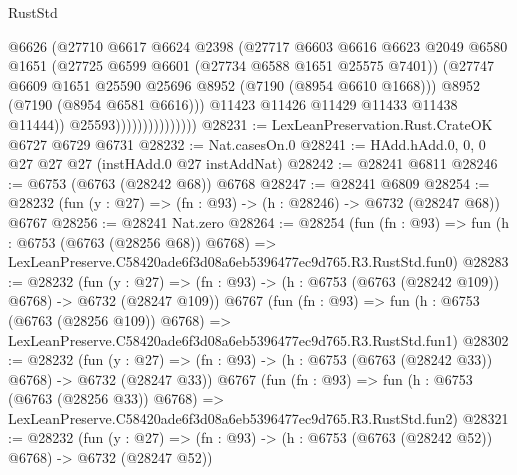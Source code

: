 \begin{lexlean}{RustStd}
\begin{coremodule}
                                    @6626
                                    (@27710
                                      @6617
                                      @6624
                                      @2398
                                      (@27717
                                        @6603
                                        @6616
                                        @6623
                                        @2049
                                        @6580
                                        @1651
                                        (@27725 @6599 @6601 (@27734 @6588 @1651 @25575 @7401))
                                        (@27747
                                          @6609
                                          @1651
                                          @25590
                                          @25696
                                          @8952
                                          (@7190 (@8954 @6610 @1668)))
                                        @8952
                                        (@7190 (@8954 @6581 @6616)))
                                      @11423
                                      @11426
                                      @11429
                                      @11433
                                      @11438
                                      @11444))
                                  @25593)))))))))))))))
@28231 := LexLeanPreservation.Rust.CrateOK @6727 @6729 @6731
@28232 := Nat.casesOn.{0}
@28241 := HAdd.hAdd.{0, 0, 0} @27 @27 @27 (instHAdd.{0} @27 instAddNat)
@28242 := @28241 @6811
@28246 := @6753 (@6763 (@28242 @68)) @6768
@28247 := @28241 @6809
@28254 := @28232 (fun (y : @27) => (fn : @93) -> (h : @28246) -> @6732 (@28247 @68)) @6767
@28256 := @28241 Nat.zero
@28264 := @28254
    (fun (fn : @93) =>
    fun (h : @6753 (@6763 (@28256 @68)) @6768) =>
    LexLeanPreserve.C58420ade6f3d08a6eb5396477ec9d765.R3.RustStd.fun0)
@28283 := @28232
    (fun (y : @27) => (fn : @93) -> (h : @6753 (@6763 (@28242 @109)) @6768) -> @6732 (@28247 @109))
    @6767
    (fun (fn : @93) =>
    fun (h : @6753 (@6763 (@28256 @109)) @6768) =>
    LexLeanPreserve.C58420ade6f3d08a6eb5396477ec9d765.R3.RustStd.fun1)
@28302 := @28232
    (fun (y : @27) => (fn : @93) -> (h : @6753 (@6763 (@28242 @33)) @6768) -> @6732 (@28247 @33))
    @6767
    (fun (fn : @93) =>
    fun (h : @6753 (@6763 (@28256 @33)) @6768) =>
    LexLeanPreserve.C58420ade6f3d08a6eb5396477ec9d765.R3.RustStd.fun2)
@28321 := @28232
    (fun (y : @27) => (fn : @93) -> (h : @6753 (@6763 (@28242 @52)) @6768) -> @6732 (@28247 @52))

\end{coremodule}
\end{lexlean}
